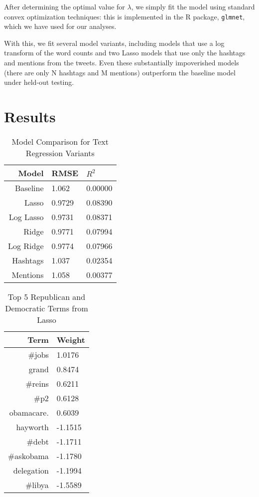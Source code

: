 \documentclass[11pt]{article}
\begin{document}
After determining the optimal value for $\lambda$, we simply fit the model using standard convex optimization techniques: this is implemented in the R package, \texttt{glmnet}, which we have used for our analyses.

With this, we fit several model variants, including models that use a log transform of the word counts and two Lasso models that use only the hashtags and mentions from the tweets. Even these substantially impoverished models (there are only N hashtags and M mentions) outperform the baseline model under held-out testing.

\section{Results}

\begin{table}[htdp]
\caption{Model Comparison for Text Regression Variants}
\begin{center}
\begin{tabular}{|r|l|l|}
\hline
Model & RMSE & $R^2$\\
\hline
Baseline & 1.062 & 0.00000 \\
Lasso & 0.9729 & 0.08390 \\
Log Lasso & 0.9731 & 0.08371 \\
Ridge & 0.9771 & 0.07994 \\
Log Ridge & 0.9774 & 0.07966 \\
Hashtags & 1.037 & 0.02354 \\
Mentions & 1.058 & 0.00377 \\
\hline
\end{tabular}
\end{center}
\end{table}

\begin{table}[htdp]
\caption{Top 5 Republican and Democratic Terms from Lasso}
\begin{center}
\begin{tabular}{|r|l|}
\hline
Term & Weight \\
\hline
\#jobs & 1.0176 \\
grand & 0.8474 \\
\#reins & 0.6211 \\
\#p2 & 0.6128 \\
obamacare. & 0.6039 \\
\hline
hayworth & -1.1515 \\
\#debt & -1.1711 \\
\#askobama & -1.1780 \\
delegation & -1.1994 \\
\#libya & -1.5589 \\
\hline
\end{tabular}
\end{center}
\end{table}
\end{document}
